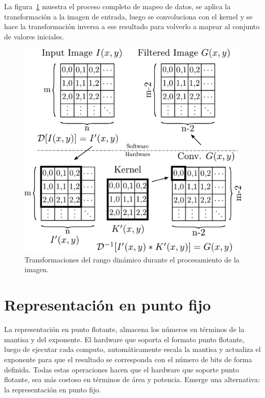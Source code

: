 La figura~\ref{transformation} muestra el proceso completo de mapeo de datos, se
aplica la transformación a la imagen de entrada, luego se convoluciona con el
kernel y se hace la transformación inversa a ese resultado para volverlo a
mapear al conjunto de valores iniciales.

\begin{figure}
\centering
\includegraphics[scale=0.47]{wflow3}
\caption{Transformaciones del rango dinámico durante el procesamiento de la imagen.}
\label{transformation}
\end{figure}

\section{Representación en punto fijo}\label{fixedpoint}

La representación en punto flotante, almacena los números en términos de la
mantisa y del exponente. El hardware que soporta el formato punto flotante,
luego de ejecutar cada computo, automáticamente escala la mantisa y actualiza el
exponente para que el resultado se corresponda con el número de bits de forma
definida. Todas estas operaciones hacen que el hardware que soporte punto
flotante, sea más costoso en términos de área y potencia. Emerge una
alternativa: la representación en punto fijo.

